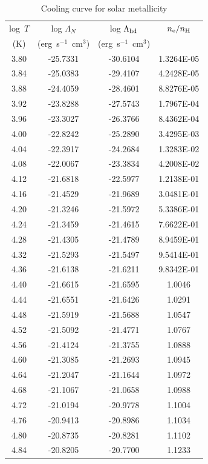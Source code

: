 \documentclass[floatfix,traditabstract,preprint2]{aa}
\begin{document}
\begin{table}[!htbp]
\centering                 
\caption{\textrm{Cooling curve for solar metallicity} }           
\label{table:KSsolar}        
\begin{tabular}{c  c c c}       
\hline\hline               
log~$T$& log $\Lambda_N$ & log $\Lambda_{\rm hd}$ & $n_{\rm e}/n_{\rm H}$\\
(K) & (erg~s$^{-1}$~cm$^{3}$) & (erg~s$^{-1}$~cm$^{3}$) & \\
\hline
3.80 & -25.7331 & -30.6104 & 1.3264E-05\\
3.84 & -25.0383 & -29.4107 & 4.2428E-05\\
3.88 & -24.4059 & -28.4601 & 8.8276E-05\\
3.92 & -23.8288 & -27.5743 & 1.7967E-04\\
3.96 & -23.3027 & -26.3766 & 8.4362E-04\\
4.00 & -22.8242 & -25.2890 & 3.4295E-03\\
4.04 & -22.3917 & -24.2684 & 1.3283E-02\\
4.08 & -22.0067 & -23.3834 & 4.2008E-02\\
4.12 & -21.6818 & -22.5977 & 1.2138E-01\\
4.16 & -21.4529 & -21.9689 & 3.0481E-01\\
4.20 & -21.3246 & -21.5972 & 5.3386E-01\\
4.24 & -21.3459 & -21.4615 & 7.6622E-01\\
4.28 & -21.4305 & -21.4789 & 8.9459E-01\\
4.32 & -21.5293 & -21.5497 & 9.5414E-01\\
4.36 & -21.6138 & -21.6211 & 9.8342E-01\\
4.40 & -21.6615 & -21.6595 & 1.0046\\
4.44 & -21.6551 & -21.6426 & 1.0291\\
4.48 & -21.5919 & -21.5688 & 1.0547\\
4.52 & -21.5092 & -21.4771 & 1.0767\\
4.56 & -21.4124 & -21.3755 & 1.0888\\
4.60 & -21.3085 & -21.2693 & 1.0945\\
4.64 & -21.2047 & -21.1644 & 1.0972\\
4.68 & -21.1067 & -21.0658 & 1.0988\\
4.72 & -21.0194 & -20.9778 & 1.1004\\
4.76 & -20.9413 & -20.8986 & 1.1034\\
4.80 & -20.8735 & -20.8281 & 1.1102\\
4.84 & -20.8205 & -20.7700 & 1.1233\\

\end{tabular}
\end{table}
\end{document}
